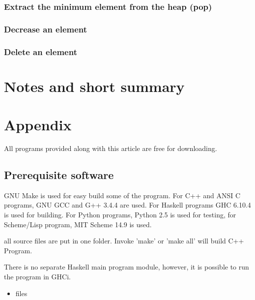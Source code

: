 \documentclass{article}
\begin{document}
\subsubsection{Extract the minimum element from the heap (pop)}


\subsubsection{Decrease an element}

\subsubsection{Delete an element}

\section{Notes and short summary}

\section{Appendix} \label{appendix}
All programs provided along with this article are free for
downloading.

\subsection{Prerequisite software}
GNU Make is used for easy build some of the program. For C++ and ANSI C programs,
GNU GCC and G++ 3.4.4 are used. 
For Haskell programs GHC 6.10.4 is used
for building. For Python programs, Python 2.5 is used for testing, for
Scheme/Lisp program, MIT Scheme 14.9 is used.

all source files are put in one folder. Invoke 'make' or 'make all'
will build C++ Program. 

There is no separate Haskell main program module, however, it is possible to run the program in GHCi.

\begin{itemize}
\item files

\end{itemize}
\end{document}
